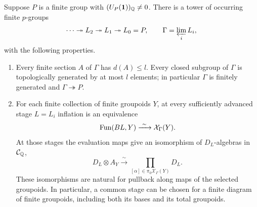 \begin{theorem}\label{thm:pro-characters}
Suppose $P$ is a finite group with $(U_P(\mathbf1))_{\mathbb Q}\ne0$.
There is a tower of occurring finite $p$-groups
\[
 \cdots\twoheadrightarrow L_2\twoheadrightarrow L_1
 \twoheadrightarrow L_0=P,
 \qquad \Gamma=\varprojlim_i L_i,
\]
with the following properties.
\begin{enumerate}[label=\textup{(\roman*)}]
\item Every finite section $A$ of $\Gamma$ has $d(A)\le l$.
Every closed subgroup of $\Gamma$ is topologically generated by at most
$l$ elements; in particular $\Gamma$ is finitely generated and
$\Gamma\twoheadrightarrow P$.
\item For each finite collection of finite groupoids $Y$, at every
sufficiently advanced stage $L=L_i$ inflation is an equivalence
\begin{equation}\label{eq:mapping-groupoid-stabilization}
 \operatorname{Fun}(BL,Y)\xrightarrow{\ \sim\ }\mathcal X_\Gamma(Y).
\end{equation}
At those stages the evaluation maps give an isomorphism of
$D_L$-algebras in $\mathcal C_{\mathbb Q}$,
\begin{equation}\label{eq:character-splitting}
 D_L\otimes A_Y\xrightarrow{\ \sim\ }
 \prod_{[\alpha]\in\pi_0\mathcal X_\Gamma(Y)}D_L.
\end{equation}
These isomorphisms are natural for pullback along maps of the selected
groupoids.  In particular, a common stage can be chosen for a finite
diagram of finite groupoids, including both its bases and its total
groupoids.
\end{enumerate}
\end{theorem}
